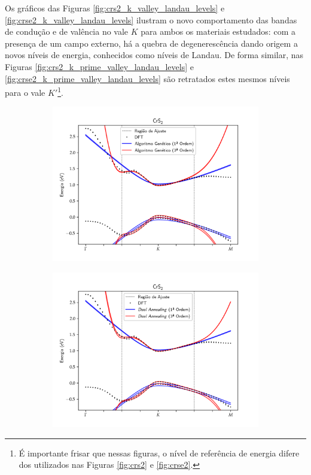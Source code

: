 Os gráficos das Figuras \ref{fig:crs2_k_valley_landau_levels} e
\ref{fig:crse2_k_valley_landau_levels} ilustram o novo comportamento das bandas
de condução e de valência no vale $K$ para ambos os materiais estudados: com a
presença de um campo externo, há a quebra de degenerescência dando origem a
novos níveis de energia, conhecidos como níveis de Landau. De forma similar, nas
Figuras \ref{fig:crs2_k_prime_valley_landau_levels} e
\ref{fig:crse2_k_prime_valley_landau_levels} são retratados estes mesmos níveis
para o vale $K'$\footnote{
  É importante frisar que nessas figuras, o nível de referência de energia
  difere dos utilizados nas Figuras \ref{fig:crs2} e \ref{fig:crse2}.
}.

\begin{figure}[p]
  \centering
  \begin{subfigure}{\textwidth}
    \includegraphics[trim=0 0.6cm 0 0.6cm,clip,width=\textwidth]{imagens/crs2_genetic_algorithm_order_13.png}
    \caption{}
    \label{fig:crs2_genetic_algorithm}
  \end{subfigure}
  \begin{subfigure}{\textwidth}
    \includegraphics[trim=0 0.6cm 0 0.6cm,clip,width=\textwidth]{imagens/crs2_dual_annealing_order_13.png}

\end{subfigure}
\end{figure}

